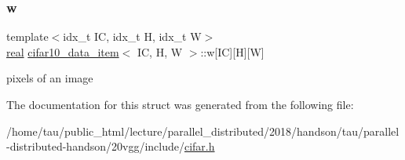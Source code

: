 \subsubsection{\texorpdfstring{w}{w}}
{\footnotesize\ttfamily template$<$idx\+\_\+t IC, idx\+\_\+t H, idx\+\_\+t W$>$ \\
\hyperlink{vgg__util_8h_a1082d08aaa761215ec83e7149f27ad16}{real} \hyperlink{structcifar10__data__item}{cifar10\+\_\+data\+\_\+item}$<$ IC, H, W $>$\+::w\mbox{[}IC\mbox{]}\mbox{[}H\mbox{]}\mbox{[}W\mbox{]}}

pixels of an image 

The documentation for this struct was generated from the following file\+:\begin{DoxyCompactItemize}
\item 
/home/tau/public\+\_\+html/lecture/parallel\+\_\+distributed/2018/handson/tau/parallel-\/distributed-\/handson/20vgg/include/\hyperlink{cifar_8h}{cifar.\+h}\end{DoxyCompactItemize}
